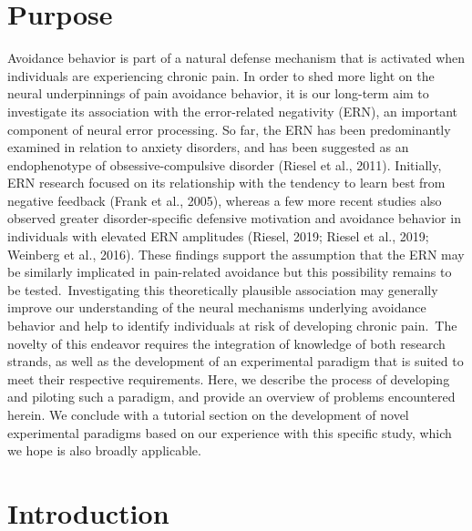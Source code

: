 \documentclass[twocolumn, serif, authordate, review]{jote-article}
\begin{document}




{}
\section*{Purpose} 
\gotoreview
\label{sec:purpose}

\noindent Avoidance behavior is part of a natural defense mechanism that is activated when individuals are experiencing chronic pain. In order to shed more light on the neural underpinnings of pain avoidance behavior, it is our long-term aim to investigate its association with the error-related negativity (ERN), an important component of neural error processing. So far, the ERN has been predominantly examined in relation to anxiety disorders, and has been suggested as an endophenotype of obsessive-compulsive disorder (Riesel et al., 2011). Initially, ERN research focused on its relationship with the tendency to learn best from negative feedback (Frank et al., 2005), whereas a few more recent studies also observed greater disorder-specific defensive motivation and avoidance behavior in individuals with elevated ERN amplitudes (Riesel, 2019; Riesel et al., 2019; Weinberg et al., 2016). These findings support the assumption that the ERN may be similarly implicated in pain-related avoidance but this possibility remains to be tested.~Investigating this theoretically plausible association may generally improve our understanding of the neural mechanisms underlying avoidance behavior and help to identify individuals at risk of developing chronic pain.~The novelty of this endeavor requires the integration of knowledge of both research strands, as well as the development of an experimental paradigm that is suited to meet their respective requirements. Here, we describe the process of developing and piloting such a paradigm, and provide an overview of problems encountered herein. We conclude with a tutorial section on the development of novel experimental paradigms based on our experience with this specific study, which we hope is also broadly applicable.


{}
\section*{Introduction} 
\gotoreview
\label{sec:introduction}
\end{document}
